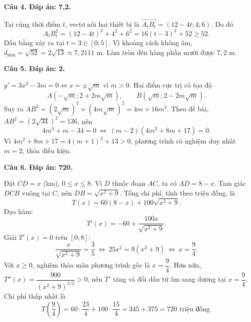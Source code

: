\documentclass[12pt,a4paper]{article}
\newcommand{\loigiai}[1]{\par\medskip\Needspace{4\baselineskip}\noindent\textbf{#1}\par\nobreak}
\begin{document}
\loigiai{Câu 4. Đáp án: 7,2.}
Tại cùng thời điểm $t$, vectơ nối hai thiết bị là
$\overrightarrow{A_tB_t}=(12-4t;4;6)$.
Do đó
\[
A_tB_t^2=(12-4t)^2+4^2+6^2=16(t-3)^2+52\ge52.
\]
Dấu bằng xảy ra tại $t=3\in[0;5]$. Vì khoảng cách không âm,
$d_{\min}=\sqrt{52}=2\sqrt{13}\approx7{,}2111$ m. Làm tròn đến hàng phần mười được $7{,}2$ m.

\newpage
\loigiai{Câu 5. Đáp án: 2.}
$y'=3x^2-3m=0\Leftrightarrow x=\pm\sqrt m$ vì $m>0$.
Hai điểm cực trị có tọa độ
\[
A(-\sqrt m;2+2m\sqrt m),\qquad B(\sqrt m;2-2m\sqrt m).
\]
Suy ra $AB^2=(2\sqrt m)^2+(4m\sqrt m)^2=4m+16m^3$.
Theo đề bài, $AB^2=(2\sqrt{34})^2=136$, nên
\[
4m^3+m-34=0
\ \Longleftrightarrow\ (m-2)(4m^2+8m+17)=0.
\]
Vì $4m^2+8m+17=4(m+1)^2+13>0$, phương trình có nghiệm duy nhất $m=2$, thỏa điều kiện.

\loigiai{Câu 6. Đáp án: 720.}
Đặt $CD=x$ (km), $0\le x\le8$. Vì $D$ thuộc đoạn $AC$, ta có $AD=8-x$.
Tam giác $DCB$ vuông tại $C$, nên $DB=\sqrt{x^2+9}$.
Tổng chi phí, tính theo triệu đồng, là
\[
T(x)=60(8-x)+100\sqrt{x^2+9}.
\]
Đạo hàm:
\[
T'(x)=-60+\frac{100x}{\sqrt{x^2+9}}.
\]
Giải $T'(x)=0$ trên $[0;8]$:
\[
\frac{x}{\sqrt{x^2+9}}=\frac35
\ \Longleftrightarrow\ 25x^2=9(x^2+9)
\ \Longleftrightarrow\ x=\frac94.
\]
Với $x\ge0$, nghiệm thỏa mãn phương trình gốc là $x=\dfrac94$. Hơn nữa,
$T''(x)=\dfrac{900}{(x^2+9)^{3/2}}>0$, nên $T'$ tăng và đổi dấu từ âm sang dương tại $x=\dfrac94$.
Chi phí thấp nhất là
\[
T\!\left(\frac94\right)=60\cdot\frac{23}4+100\cdot\frac{15}4=345+375=720\text{ triệu đồng}.
\]
\end{document}
